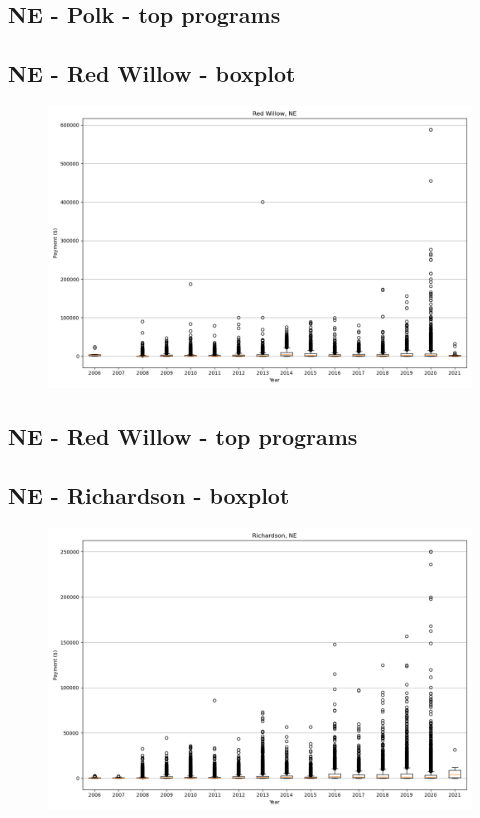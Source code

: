 \subsection*{NE - Polk - top programs}

\newpage
\subsection*{NE - Red Willow - boxplot}
\begin{figure}[h]
\centering
\includegraphics[width=7in]{../output/boxplots/counties/Red Willow-NE_boxplot.png}
\end{figure}


\subsection*{NE - Red Willow - top programs}

\newpage
\subsection*{NE - Richardson - boxplot}
\begin{figure}[h]
\centering
\includegraphics[width=7in]{../output/boxplots/counties/Richardson-NE_boxplot.png}
\end{figure}


